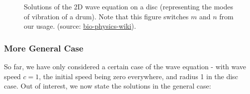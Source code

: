 \begin{enumerate}
	\begin{figure}[h!]
		\caption{Solutions of the 2D wave equation on a disc (representing the modes of vibration of a drum). Note that this figure switches $m$ and $n$ from our usage. (source: \href{http://www.bio-physics.at/wiki/index.php?title=File:Vibrations.png}{bio-physics-wiki}).}
		\label{fig:wave2d}
	\end{figure}
\end{enumerate}

\subsubsection{More General Case}

So far, we have only considered a certain case of the wave equation - with wave speed $c=1$, the initial speed being zero everywhere, and radius 1 in the disc case. Out of interest, we now state the solutions in the general case:

